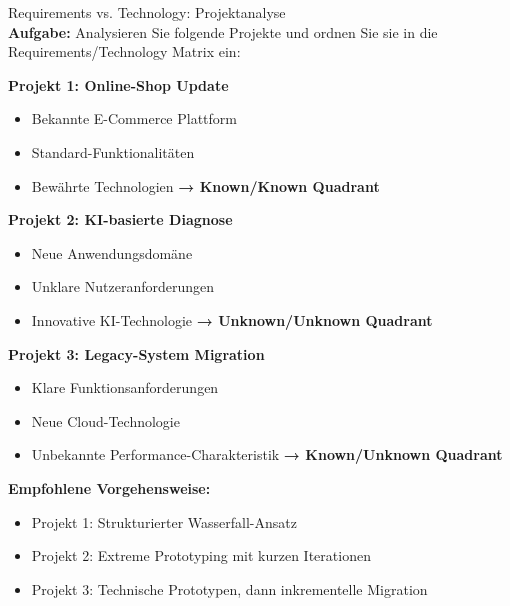 \begin{example2}{Requirements vs. Technology: Projektanalyse}\\
\textbf{Aufgabe:} Analysieren Sie folgende Projekte und ordnen Sie sie in die Requirements/Technology Matrix ein:

\textbf{Projekt 1: Online-Shop Update}
\begin{itemize}
    \item Bekannte E-Commerce Plattform
    \item Standard-Funktionalitäten
    \item Bewährte Technologien
    \textbf{→ Known/Known Quadrant}
\end{itemize}

\textbf{Projekt 2: KI-basierte Diagnose}
\begin{itemize}
    \item Neue Anwendungsdomäne
    \item Unklare Nutzeranforderungen
    \item Innovative KI-Technologie
    \textbf{→ Unknown/Unknown Quadrant}
\end{itemize}

\textbf{Projekt 3: Legacy-System Migration}
\begin{itemize}
    \item Klare Funktionsanforderungen
    \item Neue Cloud-Technologie
    \item Unbekannte Performance-Charakteristik
    \textbf{→ Known/Unknown Quadrant}
\end{itemize}

\textbf{Empfohlene Vorgehensweise:}
\begin{itemize}
    \item Projekt 1: Strukturierter Wasserfall-Ansatz
    \item Projekt 2: Extreme Prototyping mit kurzen Iterationen
    \item Projekt 3: Technische Prototypen, dann inkrementelle Migration
\end{itemize}
\end{example2}
